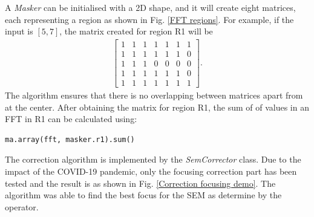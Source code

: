 \documentclass[12pt, conference]{IEEEtran}
\begin{document}
A \textit{Masker} can be initialised with a 2D shape, and it will create eight matrices, each representing a region as shown in Fig. \ref{FFT regions}. For example, if the input is $[5, 7]$, the matrix created for region R1 will be
\begin{align*}
\begin{bmatrix}
1 & 1 & 1 & 1 & 1 & 1 & 1\\
1 & 1 & 1 & 1 & 1 & 1 & 0\\
1 & 1 & 1 & 0 & 0 & 0 & 0\\
1 & 1 & 1 & 1 & 1 & 1 & 0\\
1 & 1 & 1 & 1 & 1 & 1 & 1
\end{bmatrix}.
\end{align*}
The algorithm ensures that there is no overlapping between matrices apart from at the center. After obtaining the matrix for region R1, the sum of of values in an FFT in R1 can be calculated using:
\begin{lstlisting}
ma.array(fft, masker.r1).sum()
\end{lstlisting}

The correction algorithm is implemented by the \textit{SemCorrector} class. Due to the impact of the COVID-19 pandemic, only the focusing correction part has been tested and the result is as shown in Fig. \ref{Correction focusing demo}. The algorithm was able to find the best focus for the SEM as determine by the operator.
\end{document}
